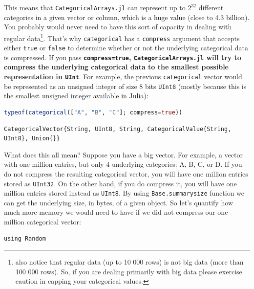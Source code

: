 \documentclass[
  notoc %
]{tufte-book}
\newcommand{\passthrough}[1]{#1}
\begin{document}
This means that \passthrough{\lstinline!CategoricalArrays.jl!} can
represent up to \(2^{32}\) different categories in a given vector or
column, which is a huge value (close to 4.3 billion). You probably would
never need to have this sort of capacity in dealing with regular
data\footnote{also notice that regular data (up to 10 000 rows) is not
  big data (more than 100 000 rows). So, if you are dealing primarily
  with big data please exercise caution in capping your categorical
  values.}. That's why \passthrough{\lstinline!categorical!} has a
\passthrough{\lstinline!compress!} argument that accepts either
\passthrough{\lstinline!true!} or \passthrough{\lstinline!false!} to
determine whether or not the underlying categorical data is compressed.
If you pass \textbf{\passthrough{\lstinline!compress=true!},
\passthrough{\lstinline!CategoricalArrays.jl!} will try to compress the
underlying categorical data to the smallest possible representation in
\passthrough{\lstinline!UInt!}}. For example, the previous
\passthrough{\lstinline!categorical!} vector would be represented as an
unsigned integer of size 8 bits \passthrough{\lstinline!UInt8!} (mostly
because this is the smallest unsigned integer available in Julia):

\begin{lstlisting}[language=Julia]
typeof(categorical(["A", "B", "C"]; compress=true))
\end{lstlisting}

\begin{lstlisting}
CategoricalVector{String, UInt8, String, CategoricalValue{String, UInt8}, Union{}}
\end{lstlisting}

What does this all mean? Suppose you have a big vector. For example, a
vector with one million entries, but only 4 underlying categories: A, B,
C, or D. If you do not compress the resulting categorical vector, you
will have one million entries stored as
\passthrough{\lstinline!UInt32!}. On the other hand, if you do compress
it, you will have one million entries stored instead as
\passthrough{\lstinline!UInt8!}. By using
\passthrough{\lstinline!Base.summarysize!} function we can get the
underlying size, in bytes, of a given object. So let's quantify how much
more memory we would need to have if we did not compress our one million
categorical vector:

\begin{lstlisting}
using Random
\end{lstlisting}
\end{document}
